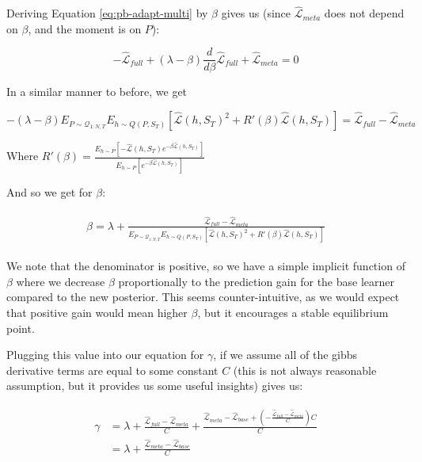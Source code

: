\documentclass[letterpaper]{article}
\theoremstyle{definition}
\begin{document}
Deriving Equation \ref{eq:pb-adapt-multi} by $\beta$ gives us (since $\hat{\mathcal{L}}_{meta}$ does not depend on $\beta$, and the moment is on $P$):

$$-\hat{\mathcal{L}}_{full}+(\lambda-\beta)\frac{d}{d\beta}\hat{\mathcal{L}}_{full}+\hat{\mathcal{L}}_{meta}=0 $$

In a similar manner to before, we get

$$-(\lambda-\beta)E_{P\sim \mathcal{Q}_{1:N,T}}E_{h\sim Q(P,S_T)}\left [\hat{\mathcal{L}}(h,S_T)^2+R'(\beta)\hat{\mathcal{L}}(h, S_T) \right ] =\hat{\mathcal{L}}_{full}-\hat{\mathcal{L}}_{meta} $$

Where $R'(\beta)=\frac{E_{h\sim P}\left[-\hat{\mathcal{L}}(h,S_T)e^{-\beta\hat{\mathcal{L}}(h,S_T)} \right]}{E_{h\sim P}\left[e^{-\beta\hat{\mathcal{L}}(h,S_T)} \right]}$

And so we get for $\beta$:

\begin{align} 
\begin{split}
\beta = \lambda+\frac{\hat{\mathcal{L}}_{full}-\hat{\mathcal{L}}_{meta}}{E_{P\sim \mathcal{Q}_{1:N,T}}E_{h\sim Q(P,S_T)}\left [\hat{\mathcal{L}}(h,S_T)^2+R'(\beta)\hat{\mathcal{L}}(h, S_T) \right ]}
\end{split}
\end{align}

We note that the denominator is positive, so we have a simple implicit function of $\beta$ where we decrease $\beta$ proportionally to the prediction gain for the base learner compared to the new posterior. This seems counter-intuitive, as we would expect that positive gain would mean higher $\beta$, but it encourages a stable equilibrium point. 

Plugging this value into our equation for $\gamma$, if we assume all of the gibbs derivative terms are equal to some constant $C$ (this is not always reasonable assumption, but it provides us some useful insights) gives us:

\begin{align} 
\begin{split}
\gamma &= \lambda+\frac{\hat{\mathcal{L}}_{full}-\hat{\mathcal{L}}_{meta} }{C}+\frac{\hat{\mathcal{L}}_{meta}-\hat{\mathcal{L}}_{base}+(-\frac{\hat{\mathcal{L}}_{full}-\hat{\mathcal{L}}_{meta}}{C})C}{C}\\
&=\lambda+\frac{\hat{\mathcal{L}}_{meta}-\hat{\mathcal{L}}_{base}}{C}
\end{split}
\end{align}
\end{document}
